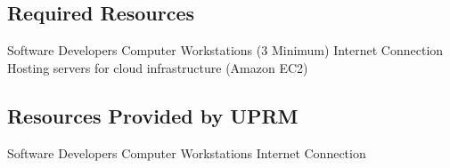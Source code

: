 
\subsection{Required Resources}
Software Developers
Computer Workstations (3 Minimum)
Internet Connection
Hosting servers for cloud infrastructure (Amazon EC2)


\subsection{Resources Provided by UPRM}
Software Developers
Computer Workstations
Internet Connection

